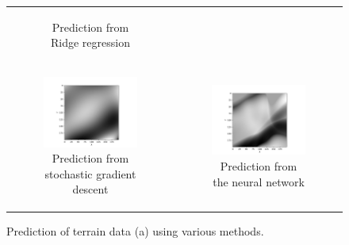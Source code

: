 \begin{figure}[t]
\begin{tabular}{cc}
\begin{subfigure}[b]{0.37\textwidth}
            \caption{Prediction from Ridge regression}
            \label{fig:terrain1-ridge}
        \end{subfigure} \\
        \begin{subfigure}[b]{0.49\textwidth}
            \centering
            \includegraphics[width=\textwidth]{examples/tests_even/figs/gradient-descent-terrain-map.pdf}
            \caption{Prediction from stochastic gradient descent}
            \label{fig:terrain1-gd}
        \end{subfigure} &
        \begin{subfigure}[b]{0.49\textwidth}
            \centering
            \includegraphics[width=\textwidth]{examples/tests_even/figs/neural-network-terrain-map.pdf}
            \caption{Prediction from the neural network}
            \label{fig:terrain1-nn}
        \end{subfigure}
    \end{tabular}
    \caption{Prediction of terrain data (a) using various methods.}
    \label{fig:terrain-allfigs}
\end{figure}
\clearpage

